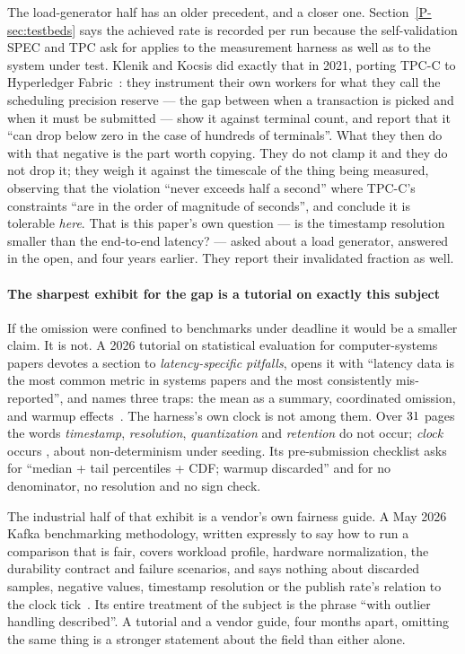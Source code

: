 \documentclass[10pt,journal,onecolumn]{IEEEtran}
\newcommand{\kafka}{Kafka}
\newcommand{\mainTestbeds}{\ref{P-sec:testbeds}}        %
\begin{document}
The load-generator half has an older precedent, and a closer one. Section~\mainTestbeds{} says
the achieved rate is recorded per run because the self-validation SPEC and TPC ask for applies
to the measurement harness as well as to the system under test. Klenik and Kocsis did exactly that in
2021, porting TPC-C to Hyperledger Fabric~\cite{klenik2021tpcc}: they instrument their own
workers for what they call the scheduling precision reserve --- the gap between when a
transaction is picked and when it must be submitted --- show it against terminal count, and
report that it ``can drop below zero in the case of hundreds of terminals''. What they then do
with that negative is the part worth copying. They do not clamp it and they do not drop it;
they weigh it against the timescale of the thing being measured, observing that the violation
``never exceeds half a second'' where TPC-C's constraints ``are in the order of magnitude of
seconds'', and conclude it is tolerable \emph{here}. That is this paper's own question --- is
the timestamp resolution smaller than the end-to-end latency? --- asked about a load generator, answered
in the open, and four years earlier. They report their invalidated fraction as well.

\paragraph{The sharpest exhibit for the gap is a tutorial on exactly this subject}
If the omission were confined to benchmarks under deadline it would be a smaller claim. It is
not. A 2026 tutorial on statistical evaluation for computer-systems papers devotes a section
to \emph{latency-specific pitfalls}, opens it with ``latency data is the most common metric in
systems papers and the most consistently mis-reported'', and names three traps: the mean as a
summary, coordinated omission, and warmup effects~\cite{krishnamachari2026playbook}. The
harness's own clock is not among them. Over $31$ pages the words
\emph{timestamp}, \emph{resolution}, \emph{quantization} and \emph{retention} do not occur;
\emph{clock} occurs \playbookClockTimes{}, about non-determinism under seeding. Its pre-submission checklist
asks for ``median + tail percentiles + CDF; warmup discarded'' and for no denominator, no
resolution and no sign check.

The industrial half of that exhibit is a vendor's own fairness guide. A May 2026
\kafka{} benchmarking methodology, written expressly to say how to run a comparison that is
fair, covers workload profile, hardware normalization, the durability contract and failure
scenarios, and says nothing about discarded samples, negative values, timestamp resolution or
the publish rate's relation to the clock tick~\cite{automq2026methodology}. Its entire treatment
of the subject is the phrase ``with outlier handling described''. A tutorial and a vendor
guide, four months apart, omitting the same thing is a stronger statement about the field than
either alone.
\end{document}
